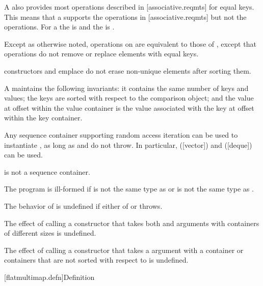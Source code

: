 \begin{addedblock}
\pnum
A  also provides most operations described
in [associative.reqmts] for equal keys.  This means that a
 supports the  operations
in [associative.reqmts] but not the  operations.  For
a  the  is  and the
 is .

\pnum
Except as otherwise noted, operations on  are equivalent
to those of , except that  operations do
not remove or replace elements with equal keys.  \begin{example}
constructors and emplace do not erase non-unique elements after sorting them.\end{example}

\pnum
A  maintains the following invariants: it contains the
same number of keys and values; the keys are sorted with respect to the
comparison object; and the value at offset  within the value
container is the value associated with the key at offset  within the
key container.

\pnum
Any sequence container  supporting random access iteration can be
used to instantiate , as long as 
and  do not throw. In particular, 
([vector]) and  ([deque]) can be
used.  \begin{note} is not a sequence container.\end{note}

\pnum
The program is ill-formed if  is not the same type
as  or
 is not the same type as .

\pnum
The behavior of  is undefined if either
of  or  throws.

\pnum
The effect of calling a constructor that takes both 
and  arguments with containers of different sizes is
undefined.

\pnum
The effect of calling a constructor that takes a 
argument with a container or containers that are not sorted with respect
to  is undefined.

[flatmultimap.defn]{Definition}


\end{addedblock}
